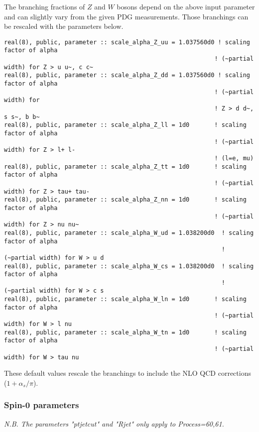 \documentclass[aps,superscriptaddress,nofootinbib]{revtex4}
\begin{document}
\noindent
The branching fractions of $Z$ and $W$ bosons depend on the above input parameter and can slightly vary from the given PDG measurements.
Those branchings can be rescaled with the parameters below.
\begin{verbatim}
real(8), public, parameter :: scale_alpha_Z_uu = 1.037560d0 ! scaling factor of alpha
                                                           ! (~partial width) for Z > u u~, c c~
real(8), public, parameter :: scale_alpha_Z_dd = 1.037560d0 ! scaling factor of alpha
                                                           ! (~partial width) for
                                                           ! Z > d d~, s s~, b b~
real(8), public, parameter :: scale_alpha_Z_ll = 1d0       ! scaling factor of alpha
                                                           ! (~partial width) for Z > l+ l-
                                                           ! (l=e, mu)
real(8), public, parameter :: scale_alpha_Z_tt = 1d0       ! scaling factor of alpha
                                                           ! (~partial width) for Z > tau+ tau-
real(8), public, parameter :: scale_alpha_Z_nn = 1d0       ! scaling factor of alpha
                                                           ! (~partial width) for Z > nu nu~
real(8), public, parameter :: scale_alpha_W_ud = 1.038200d0  ! scaling factor of alpha
                                                             ! (~partial width) for W > u d
real(8), public, parameter :: scale_alpha_W_cs = 1.038200d0  ! scaling factor of alpha
                                                             ! (~partial width) for W > c s
real(8), public, parameter :: scale_alpha_W_ln = 1d0       ! scaling factor of alpha
                                                           ! (~partial width) for W > l nu
real(8), public, parameter :: scale_alpha_W_tn = 1d0       ! scaling factor of alpha
                                                           ! (~partial width) for W > tau nu
\end{verbatim}
These default values rescale the branchings to include the NLO QCD corrections ($1+\alpha_s/\pi$).

\subsubsection{ Spin-0 parameters }

\noindent
{\it N.B.  The parameters "ptjetcut" and "Rjet" only apply to Process=60,61.}
\end{document}
